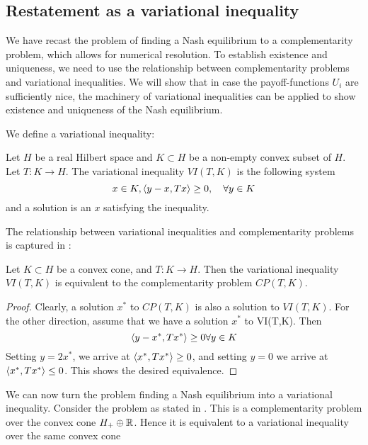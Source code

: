 \subsection{Restatement as a variational inequality}
We have recast the problem of finding a Nash equilibrium to a complementarity problem, which allows for numerical resolution. To establish existence and uniqueness, we need to use the relationship between complementarity problems and variational inequalities. We will show that in case the payoff-functions $U_i $ are sufficiently nice, the machinery of variational inequalities can be applied to show existence and uniqueness of the Nash equilibrium.

We define a variational inequality:
\begin{definition}
  Let $H$ be a real Hilbert space and $K\subset H$ be a non-empty convex subset of $H$. Let $T: K \to H$. The variational inequality $VI(T,K)$ is the following system
  \begin{equation}
    x \in K, \left \langle y-x,Tx \right \rangle \geq 0, \quad \forall y \in K
  \end{equation}
  and a solution is an $x$ satisfying the inequality.
\end{definition}
The relationship between variational inequalities and complementarity problems is captured in \citep[Proposition 12.1]{hadjisavvas2006handbook}:
\begin{proposition}
  Let $K\subset H$ be a convex cone, and $T: K \to H$. Then the variational inequality $VI(T,K)$ is equivalent to the complementarity problem $CP(T,K)$.
\end{proposition}
\begin{proof}
  Clearly, a solution $x^*$ to $CP(T,K)$ is also a solution to $VI(T,K)$. For the other direction, assume that we have a solution $x^*$ to VI(T,K). Then
  \begin{equation}
    \left \langle y - x^*,Tx^* \right \rangle \geq 0 \forall y \in K
  \end{equation}
  Setting $y = 2x^*$, we arrive at $\left \langle x^*,Tx^* \right \rangle \geq 0$, and setting $y=0$ we arrive at $\left \langle x^*,Tx^* \right \rangle \leq 0$. This shows the desired equivalence.
\end{proof}
We can now turn the problem finding a Nash equilibrium into a variational inequality. Consider the problem as stated in . This is a complementarity problem over the convex cone $H_+ \oplus \mathbb{R}$. Hence it is equivalent to a variational inequality over the same convex cone
